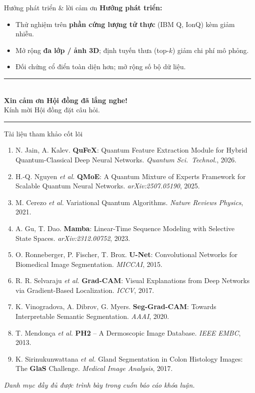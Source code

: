 \documentclass[aspectratio=169,11pt]{beamer}
\newcommand{\hl}[1]{\textcolor{hcmusblue}{\textbf{#1}}}
\begin{document}
\begin{frame}{Hướng phát triển \& lời cảm ơn}
  \textbf{Hướng phát triển:}
  \begin{itemize}
    \item Thử nghiệm trên \hl{phần cứng lượng tử thực} (IBM Q, IonQ) kèm giảm nhiễu.
    \item Mở rộng \hl{đa lớp / ảnh 3D}; định tuyến thưa (top-$k$) giảm chi phí mô phỏng.
    \item Đối chứng cổ điển toàn diện hơn; mở rộng số bộ dữ liệu.
  \end{itemize}
  \vfill
  \begin{center}
    {\color{hcmusblue}\rule{0.7\textwidth}{1pt}}\\[0.6em]
    {\LARGE\bfseries\color{hcmusblue} Xin cảm ơn Hội đồng đã lắng nghe!}\\[0.4em]
    {\large Kính mời Hội đồng đặt câu hỏi.}\\[0.5em]
    {\color{hcmusblue}\rule{0.7\textwidth}{1pt}}
  \end{center}
\end{frame}

\begin{frame}{Tài liệu tham khảo cốt lõi}
  \scriptsize
  \begin{enumerate}\setlength{\itemsep}{0.25em}
    \item N. Jain, A. Kalev. \textbf{QuFeX}: Quantum Feature Extraction Module for Hybrid Quantum-Classical Deep Neural Networks. \textit{Quantum Sci.\ Technol.}, 2026.
    \item H.-Q. Nguyen \emph{et al.} \textbf{QMoE}: A Quantum Mixture of Experts Framework for Scalable Quantum Neural Networks. \textit{arXiv:2507.05190}, 2025.
    \item M. Cerezo \emph{et al.} Variational Quantum Algorithms. \textit{Nature Reviews Physics}, 2021.
    \item A. Gu, T. Dao. \textbf{Mamba}: Linear-Time Sequence Modeling with Selective State Spaces. \textit{arXiv:2312.00752}, 2023.
    \item O. Ronneberger, P. Fischer, T. Brox. \textbf{U-Net}: Convolutional Networks for Biomedical Image Segmentation. \textit{MICCAI}, 2015.
    \item R. R. Selvaraju \emph{et al.} \textbf{Grad-CAM}: Visual Explanations from Deep Networks via Gradient-Based Localization. \textit{ICCV}, 2017.
    \item K. Vinogradova, A. Dibrov, G. Myers. \textbf{Seg-Grad-CAM}: Towards Interpretable Semantic Segmentation. \textit{AAAI}, 2020.
    \item T. Mendonça \emph{et al.} \textbf{PH2} -- A Dermoscopic Image Database. \textit{IEEE EMBC}, 2013.
    \item K. Sirinukunwattana \emph{et al.} Gland Segmentation in Colon Histology Images: The \textbf{GlaS} Challenge. \textit{Medical Image Analysis}, 2017.
  \end{enumerate}
  \vspace{0.6em}
  {\scriptsize\itshape Danh mục đầy đủ được trình bày trong cuốn báo cáo khóa luận.}
\end{frame}
\end{document}
